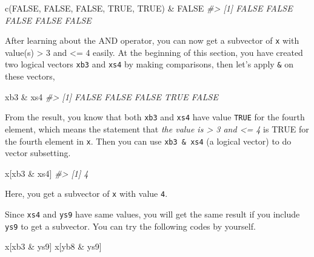 \documentclass[
]{book}
\newenvironment{Shaded}{\begin{snugshade}}{\end{snugshade}}
\newcommand{\CommentTok}[1]{\textcolor[rgb]{0.56,0.35,0.01}{\textit{#1}}}
\newcommand{\ConstantTok}[1]{\textcolor[rgb]{0.00,0.00,0.00}{#1}}
\newcommand{\FunctionTok}[1]{\textcolor[rgb]{0.00,0.00,0.00}{#1}}
\newcommand{\NormalTok}[1]{#1}
\newcommand{\SpecialCharTok}[1]{\textcolor[rgb]{0.00,0.00,0.00}{#1}}
\begin{document}
\begin{Shaded}
\begin{Highlighting}[]
\FunctionTok{c}\NormalTok{(}\ConstantTok{FALSE}\NormalTok{, }\ConstantTok{FALSE}\NormalTok{, }\ConstantTok{FALSE}\NormalTok{, }\ConstantTok{TRUE}\NormalTok{, }\ConstantTok{TRUE}\NormalTok{) }\SpecialCharTok{\&} \ConstantTok{FALSE}
\CommentTok{\#\textgreater{} [1] FALSE FALSE FALSE FALSE FALSE}
\end{Highlighting}
\end{Shaded}

After learning about the AND operator, you can now get a subvector of \texttt{x} with value(s) \textgreater{} 3 and \textless= 4 easily. At the beginning of this section, you have created two logical vectors \texttt{xb3} and \texttt{xs4} by making comparisons, then let's apply \texttt{\&} on these vectors,

\begin{Shaded}
\begin{Highlighting}[]
\NormalTok{xb3 }\SpecialCharTok{\&}\NormalTok{ xs4  }
\CommentTok{\#\textgreater{} [1] FALSE FALSE FALSE  TRUE FALSE}
\end{Highlighting}
\end{Shaded}

From the result, you know that both \texttt{xb3} and \texttt{xs4} have value \texttt{TRUE} for the fourth element, which means the statement that \emph{the value is \textgreater{} 3 and \textless= 4} is TRUE for the fourth element in \texttt{x}. Then you can use \texttt{xb3\ \&\ xs4} (a logical vector) to do vector subsetting.

\begin{Shaded}
\begin{Highlighting}[]
\NormalTok{x[xb3 }\SpecialCharTok{\&}\NormalTok{ xs4]                                      }
\CommentTok{\#\textgreater{} [1] 4}
\end{Highlighting}
\end{Shaded}

Here, you get a subvector of \texttt{x} with value \texttt{4}.

Since \texttt{xs4} and \texttt{ys9} have same values, you will get the same result if you include \texttt{ys9} to get a subvector. You can try the following codes by yourself.

\begin{Shaded}
\begin{Highlighting}[]
\NormalTok{x[xb3 }\SpecialCharTok{\&}\NormalTok{ ys9]}
\NormalTok{x[yb8 }\SpecialCharTok{\&}\NormalTok{ ys9]}
\end{Highlighting}
\end{Shaded}
\end{document}
